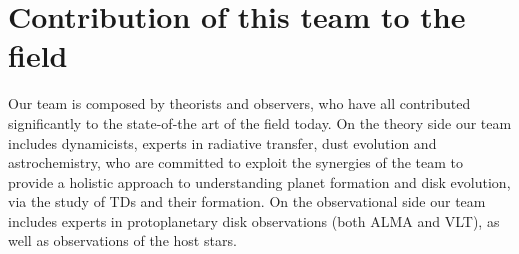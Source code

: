 \documentclass[10pt,fleqn,twoside,a4paper]{article}
\begin{document}


\section{Contribution of this team to the field }
%

Our team is composed by theorists and observers, who have all
contributed significantly to the state-of-the art of the field today. 
On the theory side our team includes
dynamicists, experts in radiative transfer, dust evolution and astrochemistry, who are
committed to exploit the synergies of the team to provide a holistic
approach to understanding planet formation and disk evolution, via the
study of TDs and their formation. On the observational side our
team includes experts in protoplanetary disk observations (both
ALMA and VLT), as well as observations of the host stars.\\
\end{document}
